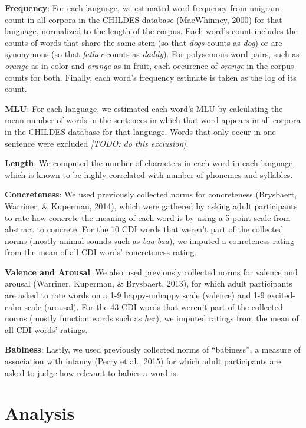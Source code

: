 \documentclass[10pt, letterpaper]{article}
\begin{document}
\textbf{Frequency}: For each language, we estimated word frequency from
unigram count in all corpora in the CHILDES database (MacWhinney, 2000)
for that language, normalized to the length of the corpus. Each word's
count includes the counts of words that share the same stem (so that
\emph{dogs} counts as \emph{dog}) or are synonymous (so that
\emph{father} counts as \emph{daddy}). For polysemous word pairs, such
as \emph{orange} as in color and \emph{orange} as in fruit, each
occurence of \emph{orange} in the corpus counts for both. Finally, each
word's frequency estimate is taken as the log of its count.

\textbf{MLU}: For each language, we estimated each word's MLU by
calculating the mean number of words in the sentences in which that word
appears in all corpora in the CHILDES database for that language. Words
that only occur in one sentence were excluded \emph{{[}TODO: do this
exclusion{]}}.

\textbf{Length}: We computed the number of characters in each word in
each language, which is known to be highly correlated with number of
phonemes and syllables.

\textbf{Concreteness}: We used previously collected norms for
concreteness (Brysbaert, Warriner, \& Kuperman, 2014), which were
gathered by asking adult participants to rate how concrete the meaning
of each word is by using a 5-point scale from abstract to concrete. For
the 10 CDI words that weren't part of the collected norms (mostly animal
sounds such as \emph{baa baa}), we imputed a conreteness rating from the
mean of all CDI words' concreteness rating.

\textbf{Valence and Arousal}: We also used previously collected norms
for valence and arousal (Warriner, Kuperman, \& Brysbaert, 2013), for
which adult participants are asked to rate words on a 1-9 happy-unhappy
scale (valence) and 1-9 excited-calm scale (arousal). For the 43 CDI
words that weren't part of the collected norms (mostly function words
such as \emph{her}), we imputed ratings from the mean of all CDI words'
ratings.

\textbf{Babiness}: Lastly, we used previously collected norms of
``babiness'', a measure of association with infancy (Perry et al., 2015)
for which adult participants are asked to judge how relevant to babies a
word is.

\section{Analysis}\label{analysis}
\end{document}
